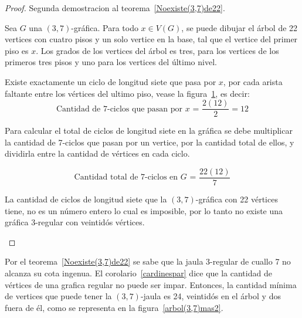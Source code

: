 \documentclass[12pt]{book}
\theoremstyle{definition}
\begin{document}
\begin{proof} Segunda demostracion al teorema~\ref{Noexiste(3,7)de22}.
 
Sea $G$ una $(3,7)$-gráfica. Para todo $x\in V(G)$, se
puede dibujar el árbol de 22 vertices con cuatro pisos y un solo
vertice en la base, tal que el
vertice del primer piso es $x$. Los grados de los vertices del árbol
es tres, para los vertices de los primeros tres pisos y uno para los
vertices del último nivel.

Existe exactamente un ciclo de longitud siete que pasa por $x$, por cada
arista faltante entre los vértices del ultimo piso,
vease la figura~\ref{arbol(3,7)contarciclos}, es decir:
\begin{equation*}
\text{Cantidad de 7-ciclos que pasan por $x$ = }\frac{2(12)}{2}=12
\end{equation*}

Para calcular el total de ciclos de longitud siete en la gráfica se
debe multiplicar la cantidad de 7-ciclos que pasan por
un vertice, por la
cantidad total de ellos, y dividirla entre la cantidad de
vértices en cada ciclo.

\begin{equation*}
\text{Cantidad total de 7-ciclos en $G$ = } \frac{22(12)}{7}  
\end{equation*}

La cantidad de ciclos de longitud siete que la $(3,7)$-gráfica con 22
vértices tiene, no es un
número entero lo cual es
imposible, por lo tanto no existe una gráfica $3$-regular con
veintidós vértices.


\begin{figure}
  \centering

  \caption{} \label{arbol(3,7)contarciclos}
\end{figure}

\end{proof}

Por el teorema~\ref{Noexiste(3,7)de22} se sabe que la jaula $3$-regular
de cuallo 7 no alcanza su cota ingenua. El corolario~\ref{cardinespar} dice que la cantidad de vértices de
una grafica regular no
puede ser impar. Entonces, la cantidad mínima de vertices que puede
tener la $(3,7)$-jaula es 24, veintidós en el árbol y dos fuera de él,
como se representa en la figura~\ref{arbol(3,7)mas2}.
\end{document}
